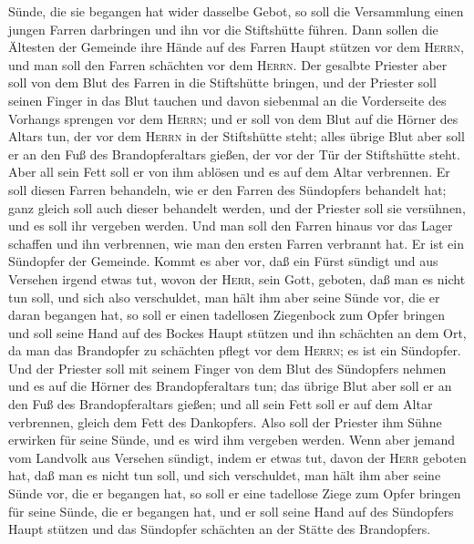 Sünde, die sie begangen hat wider dasselbe Gebot, so soll die
Versammlung einen jungen Farren darbringen und ihn vor die Stiftshütte
führen.  Dann sollen die Ältesten der Gemeinde ihre Hände
auf des Farren Haupt stützen vor dem \textsc{Herrn}, und man soll den
Farren schächten vor dem \textsc{Herrn}.  Der gesalbte
Priester aber soll von dem Blut des Farren in die Stiftshütte bringen,
 und der Priester soll seinen Finger in das Blut tauchen
und davon siebenmal an die Vorderseite des Vorhangs sprengen vor dem
\textsc{Herrn};  und er soll von dem Blut auf die Hörner
des Altars tun, der vor dem \textsc{Herrn} in der Stiftshütte steht;
alles übrige Blut aber soll er an den Fuß des Brandopferaltars gießen,
der vor der Tür der Stiftshütte steht.  Aber all sein
Fett soll er von ihm ablösen und es auf dem Altar verbrennen.
 Er soll diesen Farren behandeln, wie er den Farren des
Sündopfers behandelt hat; ganz gleich soll auch dieser behandelt werden,
und der Priester soll sie versühnen, und es soll ihr vergeben werden.
 Und man soll den Farren hinaus vor das Lager schaffen
und ihn verbrennen, wie man den ersten Farren verbrannt hat. Er ist ein
Sündopfer der Gemeinde.  Kommt es aber vor, daß ein Fürst
sündigt und aus Versehen irgend etwas tut, wovon der \textsc{Herr}, sein
Gott, geboten, daß man es nicht tun soll, und sich also verschuldet,
 man hält ihm aber seine Sünde vor, die er daran begangen
hat, so soll er einen tadellosen Ziegenbock zum Opfer bringen
 und soll seine Hand auf des Bockes Haupt stützen und ihn
schächten an dem Ort, da man das Brandopfer zu schächten pflegt vor dem
\textsc{Herrn}; es ist ein Sündopfer.  Und der Priester
soll mit seinem Finger von dem Blut des Sündopfers nehmen und es auf die
Hörner des Brandopferaltars tun; das übrige Blut aber soll er an den Fuß
des Brandopferaltars gießen;  und all sein Fett soll er
auf dem Altar verbrennen, gleich dem Fett des Dankopfers. Also soll der
Priester ihm Sühne erwirken für seine Sünde, und es wird ihm vergeben
werden.  Wenn aber jemand vom Landvolk aus Versehen
sündigt, indem er etwas tut, davon der \textsc{Herr} geboten hat, daß
man es nicht tun soll, und sich verschuldet,  man hält
ihm aber seine Sünde vor, die er begangen hat, so soll er eine tadellose
Ziege zum Opfer bringen für seine Sünde, die er begangen hat,
 und er soll seine Hand auf des Sündopfers Haupt stützen
und das Sündopfer schächten an der Stätte des Brandopfers.
